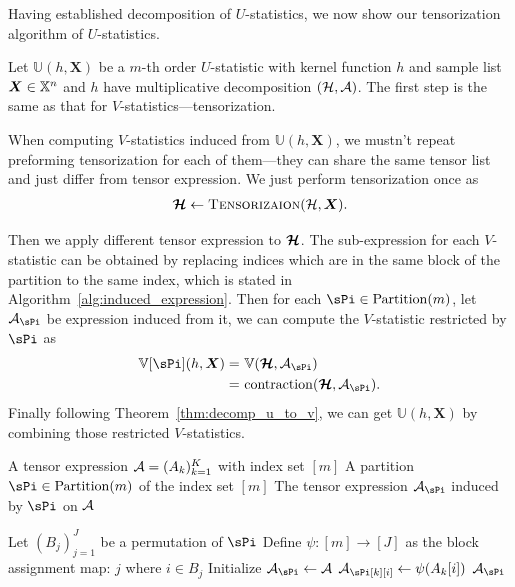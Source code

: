 \documentclass[letterpaper,11pt]{article}
\newcommand{\ustat}{\mathbb{U}}
\newcommand{\vstat}{\mathbb{V}}
\newcommand{\ustatp}[2]{\ustat(#1,#2)}
\newcommand{\vstatp}[2]{\vstat(#1,#2)}
\newcommand{\samplespace}{\bbX}
\newcommand{\partition}{\mathrm{Partition}}
\newcommand{\partitionp}[1]{\partition(#1)}
\newcommand{\tensorcontraction}{\mathrm{contraction}}
\begin{document}
Having established decomposition of $U$-statistics, we now show our tensorization algorithm of $U$-statistics.

Let $\ustatp{h}{\bm{X}}$ be a $m$-th order $U$-statistic with kernel function $h$ and sample list $\bm{X} \in \samplespace^n$ and $h$ have multiplicative decomposition $({\mathcal{H}}, {\mathcal{A}})$. The first step is the same as that for $V$-statistics---tensorization. 

When computing $V$-statistics induced from $\ustatp{h}{\bm{X}}$, we mustn't repeat preforming tensorization for each of them---they can share the same tensor list and just differ from tensor expression. We just perform tensorization once as
\begin{align*}
    \bm{{\mathcal{H}}} \gets  \textsc{Tensorizaion}({\mathcal{H}}, \bm{X}). 
\end{align*}

Then we apply different tensor expression to $\bm{{\mathcal{H}}}$. The sub-expression for each $V$-statistic can be obtained by replacing indices which are in the same block of the partition to the same index, which is stated in Algorithm~\ref{alg:induced_expression}. Then for each $\sPi \in \partitionp{m}$, let $\calA_\sPi$ be expression induced from it, we can compute the $V$-statistic restricted by $\sPi$ as
\begin{align}\label{eq:tensorization_res_v_stats}
    \vstat[\sPi](h, \bm{X}) = & \ \vstatp{\bm{\calH}}{\calA_\sPi} \notag \\ 
        = & \ \tensorcontraction(\bm{\calH}, \calA_\sPi). 
\end{align}
 Finally following Theorem~\ref{thm:decomp_u_to_v}, we can get $\ustatp{h}{\bm{X}}$ by combining those restricted $V$-statistics. 

\begin{algorithm}
    \caption{Induced Tensor Expression via Partition}
    \label{alg:induced_expression}
    \begin{algorithmic}[1]
        \Require 
        \Statex A tensor expression ${\mathcal{A}} = (A_k)_{k=1}^K$ with index set $[m]$ 
        \Statex A partition $\sPi \in \partitionp{m}$ of the index set $[m]$
        \Ensure The tensor expression $\calA_\sPi$ induced by $\sPi$ on ${\mathcal{A}}$

            \State Let $(B_j)_{j=1}^J$ be a permutation of $\sPi$
            \State Define $\psi \colon [m] \to [J]$ as the block assignment map:
                \State \Return $j$ where $i \in B_j$ 
            \EndFunction
            \State Initialize $\calA_\sPi \gets \calA$
                    \State $\calA_\sPi[k][i] \gets \psi(A_k[i])$
                \EndFor
            \EndFor
            \State \Return $\calA_\sPi$
        \EndFunction
    \end{algorithmic}
\end{algorithm}
\end{document}
